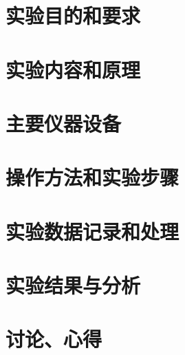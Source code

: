 \documentclass{article}
\newcommand{\装订线}{%
    \begin{tikzpicture}[remember picture, overlay]
        \draw[line width=1.2pt, dotted] 
                ($(current page.north west)+(0.5cm,-2cm)$) 
                -- ($(current page.west)+(0.5cm,2cm)$);
        \draw[line width=1.2pt, dotted] 
            ($(current page.west)+(0.5cm,-2cm)$) 
            -- ($(current page.south west)+(0.5cm,2cm)$);
        
        \node[anchor=center, inner sep=0pt] 
            at ($(current page.west)+(0.5cm + 0.075cm,0)$)  {
                {%
                    \parbox{1.5cm}{\centering\small 装 \\[0.5cm] 订 \\[0.5cm] 线}
                }
            };
    \end{tikzpicture}
}
\begin{document}
\setcounter{section}{0} %

\section{实验目的和要求}

\section{实验内容和原理}

\section{主要仪器设备}

\section{操作方法和实验步骤}

\section{实验数据记录和处理}

\section{实验结果与分析}

\section{讨论、心得}
\end{document}
